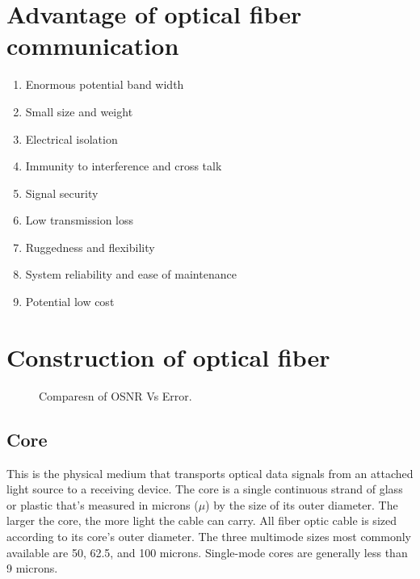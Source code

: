 \documentclass[12pt]{report}
\begin{document}
	\section{Advantage of optical fiber communication }
	\begin{enumerate}
			\item Enormous potential band width 
			\item  Small size and weight 
			\item  Electrical isolation 
			\item  Immunity to interference and cross talk 
			\item  Signal security 
			\item  Low transmission loss 
			\item  Ruggedness and flexibility 
			\item  System reliability and ease of maintenance 
			\item  Potential low cost
	\end{enumerate}
 
	\section{Construction of optical fiber}
	\begin{figure}[htbp]
		\caption{Comparesn of OSNR Vs Error.}
		\label{fig1}
	\end{figure}
	\subsection*{Core}
	This is the physical medium that transports optical data signals from an attached light source to a receiving device. The core is a single continuous strand of glass or plastic that’s measured in microns ($\mu$) by the size of its outer diameter. The larger the core, the more light the cable can carry. All fiber optic cable is sized according to its core’s outer diameter. The three multimode sizes most commonly available are 50, 62.5, and 100 microns. Single-mode cores are generally less than 9 microns.
\end{document}
